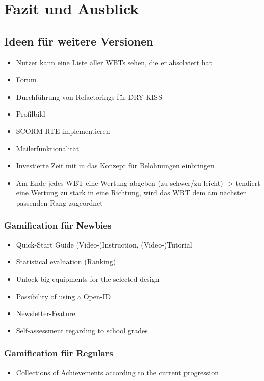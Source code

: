 \chapter{Fazit und Ausblick}\label{ref:chaptSummary}

\section{Ideen für weitere Versionen}
\begin{k}
\begin{itemize}
  \item Nutzer kann eine Liste aller WBTs sehen, die er absolviert hat
  \item Forum
  \item Durchführung von Refactorings für DRY KISS
  \item Profilbild
  \item SCORM RTE implementieren
  \item Mailerfunktionalität
  \item Investierte Zeit mit in das Konzept für Belohnungen einbringen
  \item Am Ende jedes WBT eine Wertung abgeben (zu schwer/zu leicht) -> tendiert
  eine Wertung zu stark in eine Richtung, wird das WBT dem am nächsten passenden
  Rang zugeordnet
\end{itemize}

\subsection{Gamification für Newbies}
\begin{itemize}
    \item Quick-Start Guide (Video-)Instruction, (Video-)Tutorial
    \item Statistical evaluation (Ranking)
    \item Unlock big equipments for the selected design
    \item Possibility of using a Open-ID
    \item Newsletter-Feature
    \item Self-assessment regarding to school grades
  \end{itemize}
  
 \subsection{Gamification für Regulars}
 \begin{itemize}
    \item Collections of Achievements according to the current progression
  \end{itemize}
  

\end{k}
